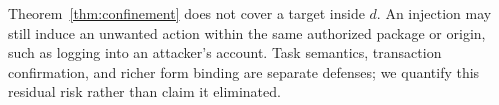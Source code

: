 \begin{remark}
Theorem~\ref{thm:confinement} does not cover a target inside $d$. An injection may still induce an unwanted action within the same authorized package or origin, such as logging into an attacker's account. Task semantics, transaction confirmation, and richer form binding are separate defenses; we quantify this residual risk rather than claim it eliminated.
\end{remark}
